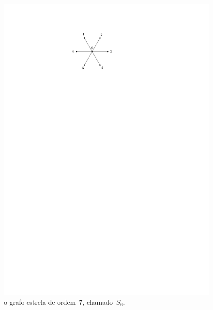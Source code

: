 \documentclass[12pt, a4paper]{article}
\theoremstyle{definition}
\begin{document}
\begin{figure}[H]
    \centering
    \includegraphics{estrela.pdf}
    \caption{o grafo estrela de ordem~$7$, chamado~$S_6$.}
    \label{fig:estrela}
\end{figure}
\end{document}
